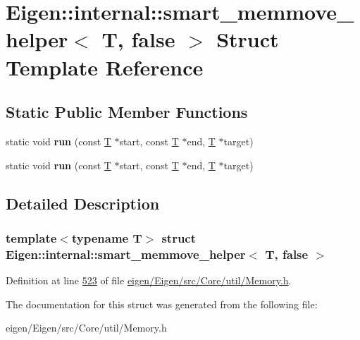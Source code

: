 \hypertarget{struct_eigen_1_1internal_1_1smart__memmove__helper_3_01_t_00_01false_01_4}{}\section{Eigen\+:\+:internal\+:\+:smart\+\_\+memmove\+\_\+helper$<$ T, false $>$ Struct Template Reference}
\label{struct_eigen_1_1internal_1_1smart__memmove__helper_3_01_t_00_01false_01_4}
\subsection*{Static Public Member Functions}
\begin{DoxyCompactItemize}
\item 
\mbox{\label{struct_eigen_1_1internal_1_1smart__memmove__helper_3_01_t_00_01false_01_4_a31722a9391830fcb006054b009fb8e2c}} 
static void {\bfseries run} (const \hyperlink{group___sparse_core___module}{T} $\ast$start, const \hyperlink{group___sparse_core___module}{T} $\ast$end, \hyperlink{group___sparse_core___module}{T} $\ast$target)
\item 
\mbox{\label{struct_eigen_1_1internal_1_1smart__memmove__helper_3_01_t_00_01false_01_4_a31722a9391830fcb006054b009fb8e2c}} 
static void {\bfseries run} (const \hyperlink{group___sparse_core___module}{T} $\ast$start, const \hyperlink{group___sparse_core___module}{T} $\ast$end, \hyperlink{group___sparse_core___module}{T} $\ast$target)
\end{DoxyCompactItemize}


\subsection{Detailed Description}
\subsubsection*{template$<$typename T$>$\newline
struct Eigen\+::internal\+::smart\+\_\+memmove\+\_\+helper$<$ T, false $>$}



Definition at line \hyperlink{eigen_2_eigen_2src_2_core_2util_2_memory_8h_source_l00523}{523} of file \hyperlink{eigen_2_eigen_2src_2_core_2util_2_memory_8h_source}{eigen/\+Eigen/src/\+Core/util/\+Memory.\+h}.



The documentation for this struct was generated from the following file\+:\begin{DoxyCompactItemize}
\item 
eigen/\+Eigen/src/\+Core/util/\+Memory.\+h\end{DoxyCompactItemize}
